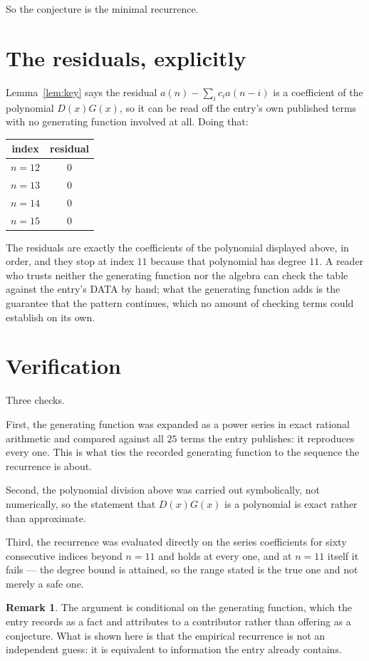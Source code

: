 \documentclass[11pt,a4paper]{article}
\theoremstyle{plain}
\theoremstyle{definition}
\newtheorem{remark}[theorem]{Remark}
\begin{document}
So the conjecture is the minimal recurrence.

\section{The residuals, explicitly}

Lemma~\ref{lem:key} says the residual $a(n)-\sum_ic_ia(n-i)$ is a coefficient of the
polynomial $D(x)G(x)$, so it can be read off the entry's own published terms with no
generating function involved at all. Doing that:
\begin{center}
\begin{tabular}{cc}
index & residual \\ \hline
$n=12$ & $0$ \\
$n=13$ & $0$ \\
$n=14$ & $0$ \\
$n=15$ & $0$
\end{tabular}
\end{center}
The residuals are exactly the coefficients of the polynomial displayed above, in order, and
they stop at index $11$ because that polynomial has degree $11$. A reader who trusts
neither the generating function nor the algebra can check the table against the entry's DATA
by hand; what the generating function adds is the guarantee that the pattern continues, which
no amount of checking terms could establish on its own.

\section{Verification}

Three checks.

First, the generating function was expanded as a power series in exact rational arithmetic and
compared against all $25$ terms the entry publishes: it reproduces every one. This is
what ties the recorded generating function to the sequence the recurrence is about.

Second, the polynomial division above was carried out symbolically, not numerically, so the
statement that $D(x)G(x)$ is a polynomial is exact rather than approximate.

Third, the recurrence was evaluated directly on the series coefficients for sixty consecutive
indices beyond $n=11$ and holds at every one, and at $n=11$ itself it fails --- the
degree bound is attained, so the range stated is the true one and not merely a safe one.

\begin{remark}
The argument is conditional on the generating function, which the entry records as a fact and
attributes to a contributor rather than offering as a conjecture. What is shown here is that
the empirical recurrence is not an independent guess: it is equivalent to information the
entry already contains.
\end{remark}
\end{document}
